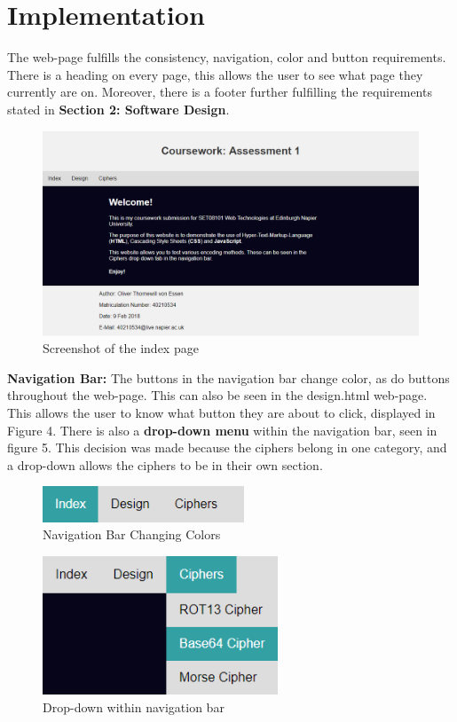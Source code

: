 \documentclass[10pt, a4paper]{article}
\begin{document}
\pagebreak
    \section{Implementation}
    The web-page fulfills the consistency, navigation, color and button requirements. There is a heading on every page, this allows the user to see what page they currently are on. Moreover, there is a footer further fulfilling the requirements stated in     \textbf{Section 2: Software Design}.
    \begin{figure}[H]
    \centering
    \includegraphics[width=120mm]{images/index.png}
    \caption{Screenshot of the index page}
    \end{figure}
    \textbf{Navigation Bar:} The buttons in the navigation bar change color, as do buttons throughout the web-page. This can also be seen in the design.html web-page. This allows the user to know what button they are about to click, displayed in Figure 4. There is also a \textbf{drop-down menu} within the navigation bar, seen in figure 5. This decision was made because the ciphers belong in one category, and a drop-down allows the ciphers to be in their own section.
    \begin{figure}[H]
    \centering
    \includegraphics[width=60mm]{images/navbar_hover.png}
    \caption{Navigation Bar Changing Colors}
    \end{figure}

    \begin{figure}[H]
    \centering
    \includegraphics[width=70mm]{images/dropdown_hover.png}
    \caption{Drop-down within navigation bar}
    \end{figure}
\end{document}
